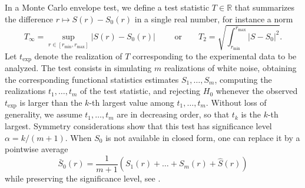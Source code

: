 In a Monte Carlo envelope test, we define a test statistic $T\in\mathbb{R}$ that
summarizes the difference $r\mapsto S(r)-S_{0}(r)$ in a
single real number, for instance a norm 
\begin{equation}
\label{e:norms}
T_\infty= \sup_{r\in [r_{\min},r_{\max}]}\vert S(r)-S_0(r)\vert\qquad\text{  or
}\qquad T_2=\sqrt{\int_{r_{\min}}^{r_{\max}} \vert S-S_0\vert^2}.
\end{equation} 
Let $t_{\text{exp}}$ denote the realization of $T$ corresponding to the experimental data to be
analyzed. The test consists in simulating $m$ realizations of white noise,
obtaining the corresponding functional statistics estimates $S_1,\dots,S_m$,
computing the realizations $t_1,\dots,t_m$ of the test statistic, and rejecting $H_0$ whenever
the observed $t_{\text{exp}}$ is larger than the $k$-th largest value among
$t_1,\dots,t_m$. Without loss of generality, we assume $t_1,\dots,t_m$ are
in decreasing order, so that $t_k$ is the $k$-th largest. Symmetry
considerations show that this test has significance level $\alpha=k/(m+1)$. When
$S_0$ is not available in closed form, one can replace it by a pointwise average
\begin{equation}
\label{e:average}
\bar{S}_0(r) = \frac{1}{m+1}(S_1(r)+\dots+S_m(r)+\hat{S}(r))
\end{equation}
while preserving the significance level, see \citep{BDHLMN14}.


